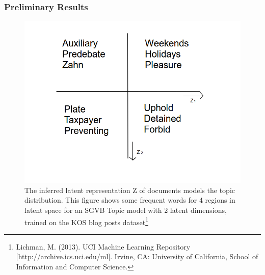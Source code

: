 \documentclass{beamer}
\begin{document}
\begin{frame}
\frametitle{Preliminary Results}
\vspace{-2mm}
\begin{figure}
\includegraphics[scale=0.3]{superkutte_visualisatie.png}
\vspace{-12mm}
\caption{The inferred latent representation Z of documents models the topic distribution. This figure shows some frequent words for 4 regions in latent space for an SGVB Topic model with 2 latent dimensions, trained on the KOS blog posts dataset\footnote{Lichman, M. (2013). UCI Machine Learning Repository [http://archive.ics.uci.edu/ml]. Irvine, CA: University of California, School of Information and Computer Science.}}
\end{figure}
\end{frame}
\end{document}
